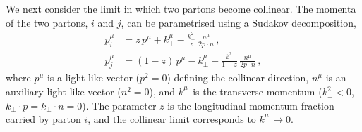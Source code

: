 We next consider the limit in which two partons become collinear.
The momenta of the two partons, $i$ and $j$, can be parametrised using a Sudakov
decomposition,
\begin{equation}
\begin{aligned}
    p_i^\mu &= z\, p^\mu + k_\perp^\mu
               - \frac{k_\perp^2}{z}\,\frac{n^\mu}{2p\cdot n}\,, \\
    p_j^\mu &= (1-z)\,p^\mu - k_\perp^\mu
               - \frac{k_\perp^2}{1-z}\,\frac{n^\mu}{2p\cdot n}\,,
\end{aligned}
\end{equation}
where $p^\mu$ is a light-like vector ($p^2 = 0$) defining the collinear 
direction, $n^\mu$ is an auxiliary light-like vector ($n^2 = 0$), and $k_\perp^\mu$ 
is the transverse momentum ($k_\perp^2 < 0$, $k_\perp \cdot p = k_\perp \cdot n = 0$).
The parameter $z$ is the longitudinal momentum fraction carried by parton $i$,
and the collinear limit corresponds to $k_\perp^\mu\to0$.

